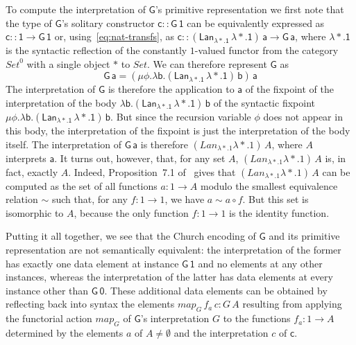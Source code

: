 \documentclass[acmsmall,screen,review,anonymous]{acmart}
\theoremstyle{definition}
\newcommand{\set}{\mathsf{Set}}
\begin{document}
\begin{example}
To compute the interpretation of $\mathsf{G}$'s primitive
representation we first note that the type of $\mathsf{G}$'s solitary
constructor $\mathsf{c :: G\,1}$ can be equivalently expressed as
$\mathsf{c :: 1 \to G\,1}$ or, using~\eqref{eq:nat-transfs}, as
$\mathsf{c :: (Lan_{\lambda *. 1}\,\lambda *. 1)\,a \to G\, a}$, where
$\mathsf{\lambda *. 1}$ is the syntactic reflection of the constantly
$1$-valued functor from the category $\mathit{Set}^0$ with a single
object $*$ to $\mathit{Set}$. We can therefore represent $\mathsf{G}$
as
\[\mathsf{G\,a} = \mathsf{(\mu \phi. \lambda b.
 (Lan_{\lambda *. 1} \,\lambda *.  1)\,b)\,a}\] The interpretation of
$\mathsf{G}$ is therefore the application to $\mathsf{a}$ of the
fixpoint of the interpretation of the body $\mathsf{\lambda
  b. (Lan_{\lambda *. 1} \,\lambda *. 1)\,b}$ of the syntactic
fixpoint $\mathsf{\mu \phi. \lambda b.  (Lan_{\lambda *. 1} \,\lambda
  *.  1)\,b}$. But since the recursion variable $\mathsf{\phi}$ does
not appear in this body, the interpretation of the fixpoint is just
the interpretation of the body itself.  The interpretation of
$\mathsf{G\,a}$ is therefore $(\mathit{Lan}_{\lambda *. 1} \lambda
*. 1)\, A$, where $A$ interprets $\mathsf{a}$.
It turns out, however, that, for any set $A$, $(\mathit{Lan}_{\lambda
  *. 1} \lambda *. 1)\,A$ is, in fact, exactly $A$. Indeed,
Proposition~7.1 of~\cite{blw03} gives that $(\mathit{Lan}_{\lambda
  *. 1} \lambda *. 1)\,A$ can be computed as the set of all functions
$a : 1 \to A$ modulo the smallest equivalence relation $\sim$ such
that, for any $f : 1 \to 1$, we have $a \sim a \circ f$.  But this set
is isomorphic to $A$, because the only function $f : 1 \to 1$ is the
identity function.


Putting it all together, we see that the Church encoding of
$\mathsf{G}$ and its primitive representation are not semantically
equivalent: the interpretation of the former has exactly one data
element at instance $\mathsf{G\,1}$ and no elements at any other
instances, whereas the interpretation of the latter has data elements
at every instance other than $\mathsf{G\,0}$.
These additional data elements can be obtained by reflecting back into
syntax the elements $\mathit{map}_G\,f_a\,c : G\,A$ resulting from
applying the functorial action $\mathit{map}_G$ of $\mathsf{G}$'s
interpretation $G$ to the functions $f_a : 1 \to A$ determined by the
elements $a$ of $A \not = \emptyset$ and the interpretation $c$ of
$\mathsf{c}$.
\end{example}
\end{document}
